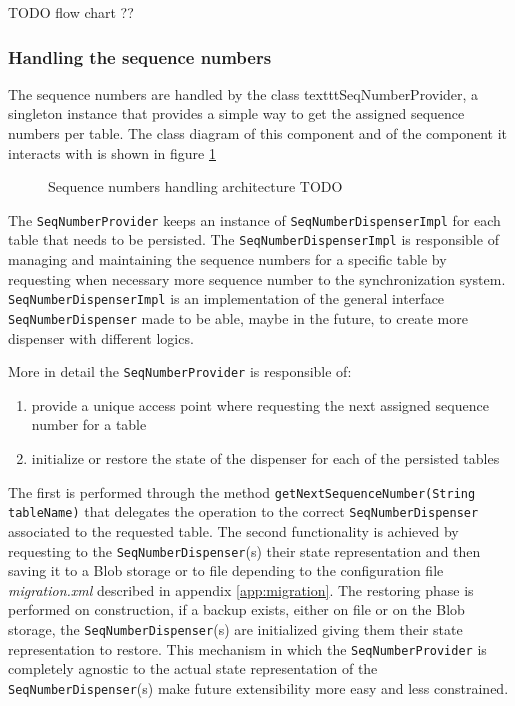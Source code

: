 \newparagraph TODO flow chart ??

\subsubsection{Handling the sequence numbers}
The sequence numbers are handled by the class texttt{SeqNumberProvider}, a singleton instance that provides a simple way to get the assigned sequence numbers per table.
\noindent The class diagram of this component and of the component it interacts with is shown in figure \ref{fig:seq-provider}

\begin{figure}[tbh]
  \centering
  \begin{minipage}[c][0.33\textheight][c]{0.5\textwidth}
  \end{minipage}
  \caption{Sequence numbers handling architecture TODO}
  \label{fig:seq-provider}
\end{figure} 

\noindent The \texttt{SeqNumberProvider} keeps an instance of \texttt{SeqNumberDispenserImpl} for each table that needs to be persisted. The \texttt{SeqNumberDispenserImpl} is responsible of managing and maintaining the sequence numbers for a specific table by requesting when necessary more sequence number to the synchronization system.
\texttt{SeqNumberDispenserImpl} is an implementation of the general interface \texttt{SeqNumberDispenser} made to be able, maybe in the future, to create more dispenser with different logics.

More in detail the \texttt{SeqNumberProvider} is responsible of:
\begin{enumerate}
\item provide a unique access point where requesting the next assigned sequence number for a table
\item initialize or restore the state of the dispenser for each of the persisted tables
\end{enumerate}
\noindent The first is performed through the method \texttt{getNextSequenceNumber(String tableName)} that delegates the operation to the correct \texttt{SeqNumberDispenser} associated to the requested table.
The second functionality is achieved by requesting to the \texttt{SeqNumberDispenser}(s) their state representation and then saving it to a Blob storage or to file depending to the configuration file \textit{migration.xml} described in appendix \ref{app:migration}. The restoring phase is performed on construction, if a backup exists, either on file or on the Blob storage, the \texttt{SeqNumberDispenser}(s) are initialized giving them their state representation to restore.
This mechanism in which the \texttt{SeqNumberProvider} is completely agnostic to the actual state representation of the \texttt{SeqNumberDispenser}(s) make future extensibility more easy and less constrained.

